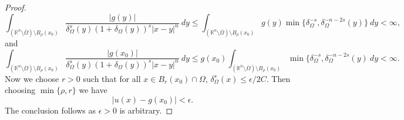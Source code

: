 \documentclass{amsart}
\newcommand{\R}{\mathbb{R}}
\begin{document}
\begin{proof}
    \begin{equation*}
        \int_{(\R^{n}\setminus\overline{\Omega})\setminus B_{\rho}(x_{0})}\frac{|g(y)|}{\delta_{\Omega}^{s}(y)(1+\delta_{\Omega}(y))^{s}|x-y|^{n}}\ dy \leq \int_{(\R^{n}\setminus\overline{\Omega})\setminus B_{\rho}(x_{0})}g(y)\min\{\delta_{\Omega}^{-s},\delta_{\Omega}^{-n-2s}(y)\}\ dy <\infty,
    \end{equation*}
    and 
    \begin{equation*}
        \int_{(\R^{n}\setminus\overline{\Omega})\setminus B_{\rho}(x_{0})}\frac{|g(x_{0})|}{\delta_{\Omega}^{s}(y)(1+\delta_{\Omega}(y))^{s}|x-y|^{n}}\ dy\leq g(x_{0})\int_{(\R^{n}\setminus\overline{\Omega})\setminus B_{\rho}(x_{0})}\min\{\delta_{\Omega}^{-s},\delta_{\Omega}^{-n-2s}(y)\ dy<\infty.
    \end{equation*}
    Now we choose $r>0$ such that for all $x\in B_{r}(x_{0})\cap \Omega$, $\delta_{\Omega}^{s}(x)\leq \epsilon/2C$. Then choosing $\min\{\rho,r\}$ we have
    \begin{equation*}
        |u(x)-g(x_{0})|<\epsilon.
    \end{equation*}
    The conclusion follows as $\epsilon>0$ is arbitrary. 
\end{proof}
\end{document}
